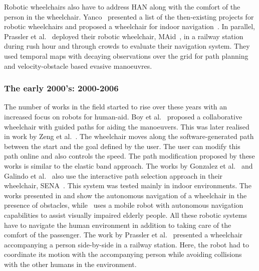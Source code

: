 Robotic wheelchairs also have to address HAN along with the comfort of the person in the wheelchair. Yanco~\cite{yanco1998integrating} presented a list of the then-existing projects for robotic wheelchairs and proposed a wheelchair for indoor navigation~\cite{yanco1998wheelesley}. In parallel, Prassler et al.~\cite{prassler1999navigating} deployed their robotic wheelchair, MAid~\cite{prassler1998maid}, in a railway station during rush hour and through crowds to evaluate their navigation system. They used temporal maps with decaying observations over the grid for path planning and velocity-obstacle based evasive manoeuvres.
 
\subsubsection{The early 2000's: 2000-2006}
The number of works in the field started to rise over these years with an increased focus on robots for human-aid. Boy et al.~\cite{boy2002collaborative} proposed a collaborative wheelchair with guided paths for aiding the manoeuvers. This was later realised in work by Zeng et al.~\cite{zeng2006design}. The wheelchair moves along the software-generated path between the start and the goal defined by the user. The user can modify this path online and also controls the speed. The path modification proposed by these works is similar to the elastic band approach. The works by Gonzalez et al.~\cite{gonzalez2006sena} and Galindo et al.~\cite{galindo2006control} also use the interactive path selection approach in their wheelchair, SENA~\cite{gonzalez2006description}. This system was tested mainly in indoor environments. The works presented in \cite{rao2002human} and \cite{parikh2003human} show the autonomous navigation of a wheelchair in the presence of obstacles, while~\cite{morris2003robotic} uses a mobile robot with autonomous navigation capabilities to assist visually impaired elderly people. All these robotic systems have to navigate the human environment in addition to taking care of the comfort of the passenger. The work by Prassler et al.~\cite{prassler2002key} presented a wheelchair accompanying a person side-by-side in a railway station. Here, the robot had to coordinate its motion with the accompanying person while avoiding collisions with the other humans in the environment.

